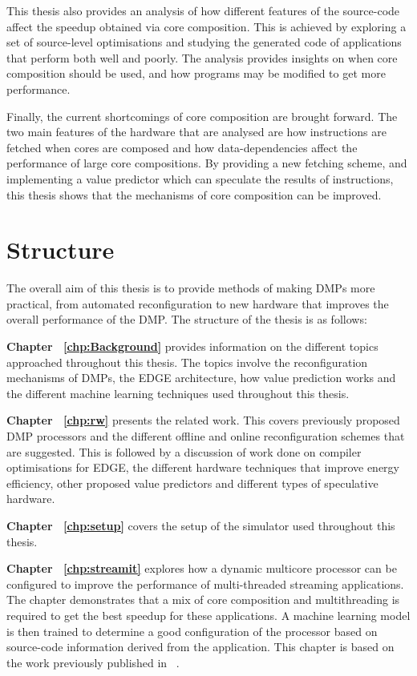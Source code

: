 This thesis also provides an analysis of how different features of the source-code affect the speedup obtained via core composition.
This is achieved by exploring a set of source-level optimisations and studying the generated code of applications that perform both well and poorly.
The analysis provides insights on when core composition should be used, and how programs may be modified to get more performance.

Finally, the current shortcomings of core composition are brought forward.
The two main features of the hardware that are analysed are how instructions are fetched when cores are composed and how data-dependencies affect the performance of large core compositions.
By providing a new fetching scheme, and implementing a value predictor which can speculate the results of instructions, this thesis shows that the mechanisms of core composition can be improved.


\section{Structure}
The overall aim of this thesis is to provide methods of making DMPs more practical, from automated reconfiguration to new hardware that improves the overall performance of the DMP.
The structure of the thesis is as follows:

\textbf{Chapter ~\ref{chp:Background}} provides information on the different topics approached throughout this thesis. The topics involve the reconfiguration mechanisms of DMPs, the EDGE architecture, how value prediction works and the different machine learning techniques used throughout this thesis.

\textbf{Chapter ~\ref{chp:rw}} presents the related work. This covers previously proposed DMP processors and the different offline and online reconfiguration schemes that are suggested. 
This is followed by a discussion of work done on compiler optimisations for EDGE, the different hardware techniques that improve energy efficiency, other proposed value predictors and different types of speculative hardware.

\textbf{Chapter ~\ref{chp:setup}} covers the setup of the simulator used throughout this thesis.

\textbf{Chapter ~\ref{chp:streamit}} explores how a dynamic multicore processor can be configured to improve the performance of multi-threaded streaming applications.
The chapter demonstrates that a mix of core composition and multithreading is required to get the best speedup for these applications.
A machine learning model is then trained to determine a good configuration of the processor based on source-code information derived from the application.
This chapter is based on the work previously published in ~\cite{micolet2016dmpstream}.

